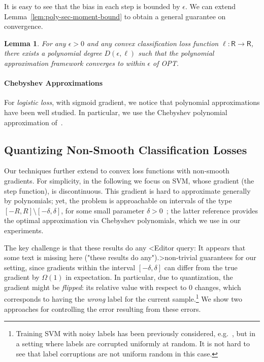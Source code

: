 \documentclass{article}
\newcommand{\R}{\mathsf{R}}
\newtheorem{lemma}{Lemma}
\begin{document}
\vspace{-0.5em}
It is easy to see that the bias in each step is bounded by $\epsilon$. 
We can extend Lemma~\ref{lem:poly-sec-moment-bound} to obtain a general guarantee on convergence. 

\begin{lemma}
	For any $\epsilon > 0$ and any convex classification loss function $\ell: \R \rightarrow \R$, there exists a polynomial degree $D(\epsilon, \ell)$ such that the polynomial approximation framework converges to within $\epsilon$ of OPT.  
\end{lemma}

\vspace{-0.5em}
\paragraph{Chebyshev Approximations} 
For \emph{logistic loss}, with sigmoid gradient, we notice that polynomial approximations have been well studied. In particular, we use the Chebyshev polynomial approximation of~\cite{vlcek2012chebyshev}. 

\vspace{-0.5em}
\subsection{Quantizing Non-Smooth Classification Losses}
\vspace{-0.5em}

Our techniques further extend to convex loss functions with non-smooth gradients.  
For simplicity, in the following we focus on SVM, whose gradient (the step function), is discontinuous. 
This gradient is hard to approximate generally by polynomials; yet, the problem is approachable on intervals of the type $[-R, R] \setminus [-\delta, \delta]$, for some small parameter $\delta > 0$~\cite{frostig2016principal, allen2016faster}; the latter reference provides the optimal approximation via Chebyshev polynomials, which we use in our experiments. 

The key challenge is that these results do any <Editor query: It appears that some text is missing here ("these results do any").>non-trivial guarantees for our setting, since gradients within the interval $[-\delta, \delta]$ can differ from the true gradient by $\Omega (1)$ in expectation. In particular, due to quantization, the gradient might be \emph{flipped}: 
its relative value with respect to $0$ changes, which corresponds to having the \emph{wrong} label for the current sample.\footnote{Training SVM with noisy labels has been previously considered, e.g.~\cite{Natarajan:2013:NIPS}, but in a setting where labels are corrupted uniformly at random. It is not hard to see that label corruptions are not uniform random in this case.}
We show two approaches for controlling the error resulting from these errors. 
\end{document}
